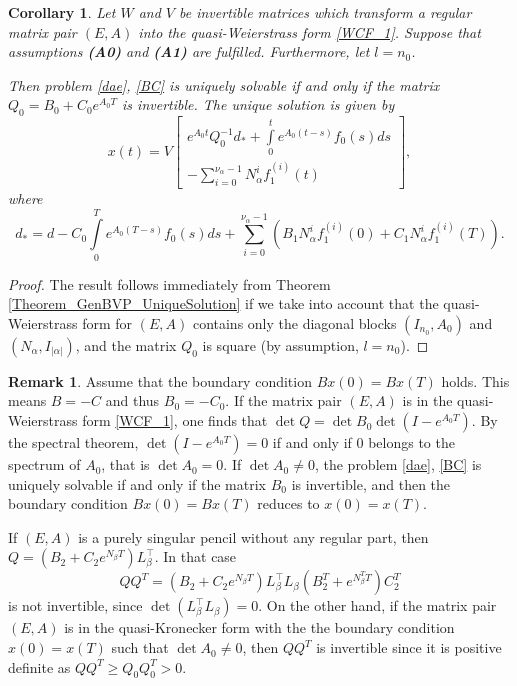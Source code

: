 \documentclass[preprint,12pt]{elsarticle}
\numberwithin{equation}{section}
\newtheorem{corollary}[theorem]{Corollary}
\theoremstyle{definition}
\newtheorem{remark}[theorem]{Remark}
\begin{document}
\begin{corollary}\label{Corrolary}
Let $W$ and $V$ be invertible matrices which transform a regular matrix pair $(E,A)$ into the quasi-Weierstrass form \eqref{WCF_1}. Suppose that assumptions \textnormal{\textbf{(A0)}} and \textnormal{\textbf{(A1)}} are fulfilled. Furthermore, let $l=n_0$.

Then problem \eqref{dae}, \eqref{BC} is uniquely solvable if and only if the matrix $Q_0=B_0+C_0 e^{A_0 T}$ is invertible.
The unique solution is given by
\begin{equation}\label{Corollary_solution}
 x(t)=V\begin{bmatrix}
     e^{A_0t}Q_0^{-1}d_*+\int\limits_0^t e^{A_0(t-s)}f_0(s)ds\\
     -\sum\limits_{i=0}^{\nu_{\alpha}-1}N_{\alpha}^i f_1^{(i)}(t)
 \end{bmatrix},
\end{equation}
where
\begin{equation}\label{d*_hat}
d_*=
d-C_0\int\limits_0^T e^{A_0(T-s)}f_0(s)ds+\sum\limits_{i=0}^{\nu_{\alpha}-1}\left(B_1 N_{\alpha}^i f_1^{(i)}(0)+C_1N_{\alpha}^i f_1^{(i)}(T)\right).
\end{equation}
\end{corollary}
\begin{proof} The result follows immediately from Theorem \ref{Theorem_GenBVP_UniqueSolution} if we take into account that the quasi-Weierstrass form for $(E,A)$ contains only the diagonal blocks $(I_{n_0}, A_0)$ and $(N_{\alpha}, I_{|\alpha|})$, and the matrix $Q_0$ is square (by assumption, $l=n_0$).
\end{proof}



\begin{remark}

Assume that the boundary condition $Bx(0)=Bx(T)$ holds. This means
$B=-C$ and thus $B_0=-C_0$. If the
matrix pair $(E,A)$ is in the quasi-Weierstrass form \eqref{WCF_1}, one finds
that $\det Q=\det B_0 \det(I-e^{A_0 T})$. By the spectral theorem, 
$\det(I-e^{A_0 T})=0$ if and only if  $0$ belongs to the spectrum
of $A_0$, that is $\det A_0=0$.  If  $\det A_0\not=0$, the
problem \eqref{dae}, \eqref{BC} is uniquely solvable if and only if the matrix
$B_0$ is invertible, and then the boundary condition $Bx(0)=Bx(T)$ reduces to
$x(0)=x(T)$.

If $(E,A)$ is a purely singular pencil without any regular part,
then $Q=(B_2+C_2 e^{N_{\beta} T})L_\beta^\top$. In that case 
$$
QQ^T=(B_2+C_2 e^{N_{\beta} T})L_\beta^\top L_\beta(B_2^T+e^{N_{\beta}^T T})C_2^T
$$ is not invertible, since $\det (L_\beta^\top L_\beta)=0$. On the other hand,
if the
matrix pair $(E,A)$ is in the quasi-Kronecker form with the the boundary condition $x(0)=x(T)$ such that $\det A_0\not=0$, then $QQ^T$ is invertible since it is positive definite as
$QQ^T\ge Q_0Q_0^T>0$.
\end {remark}
\end{document}
